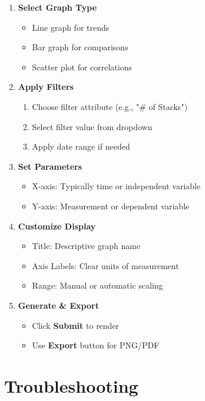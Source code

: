 \documentclass[12pt]{article}
\begin{document}
\begin{enumerate}
    \item \textbf{Select Graph Type}
    \begin{itemize}
        \item Line graph for trends
        \item Bar graph for comparisons
        \item Scatter plot for correlations
    \end{itemize}
    
    \item \textbf{Apply Filters}
    \begin{enumerate}
        \item Choose filter attribute (e.g., "\# of Stacks")
        \item Select filter value from dropdown
        \item Apply date range if needed
    \end{enumerate}
    
    \item \textbf{Set Parameters}
    \begin{itemize}
        \item X-axis: Typically time or independent variable
        \item Y-axis: Measurement or dependent variable
    \end{itemize}
    
    \item \textbf{Customize Display}
    \begin{itemize}
        \item Title: Descriptive graph name
        \item Axis Labels: Clear units of measurement
        \item Range: Manual or automatic scaling
    \end{itemize}
    
    \item \textbf{Generate \& Export}
    \begin{itemize}
        \item Click \textbf{Submit} to render
        \item Use \textbf{Export} button for PNG/PDF
    \end{itemize}
\end{enumerate}

\section{Troubleshooting}
\end{document}
